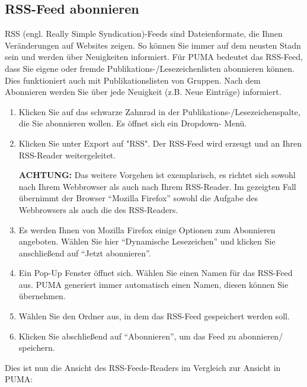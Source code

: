 \subsection{RSS-Feed abonnieren}
RSS (engl. Really Simple Syndication)-Feeds sind Dateienformate, die Ihnen Veränderungen auf Websites zeigen. So können Sie immer auf dem neusten Stadn sein und werden über Neuigkeiten informiert. Für PUMA bedeutet das RSS-Feed, dass Sie eigene oder fremde Publikations-/Lesezeichenlisten abonnieren können. Dies funktioniert auch mit Publikationslisten von Gruppen. Nach dem Abonnieren werden Sie über jede Neuigkeit (z.B. Neue Einträge) informiert. %
\begin{enumerate}
    \item Klicken Sie auf das schwarze Zahnrad in der Publikations-/Lesezeichenspalte, die Sie abonnieren wollen. Es öffnet sich ein Dropdown- Menü.
    \item  Klicken Sie unter Export auf "RSS". Der RSS-Feed wird erzeugt und an Ihren RSS-Reader weitergeleitet. 
\begin{shaded} \centering
\textbf{ACHTUNG:} Das weitere Vorgehen ist exemplarisch, es richtet sich sowohl nach Ihrem Webbrowser als auch nach Ihrem RSS-Reader. Im gezeigten Fall übernimmt der Browser \enquote{Mozilla Firefox} sowohl die Aufgabe des Webbrowsers als auch die des RSS-Readers.
\end{shaded}
    \item Es werden Ihnen von Mozilla Firefox einige Optionen zum Abonnieren angeboten. Wählen Sie hier \enquote{Dynamische Lesezeichen} und klicken Sie anschließend auf \enquote{Jetzt abonnieren}.
    \item Ein Pop-Up Fenster öffnet sich. Wählen Sie einen Namen für das RSS-Feed aus. PUMA generiert immer automatisch einen Namen, diesen können Sie übernehmen.
    \item Wählen Sie den Ordner aus, in dem das RSS-Feed gespeichert werden soll.
    \item Klicken Sie abschließend auf \enquote{Abonnieren}, um das Feed zu abonnieren/ speichern.
\end{enumerate}
Dies ist nun die Ansicht des RSS-Feeds-Readers im Vergleich zur Ansicht in PUMA:
